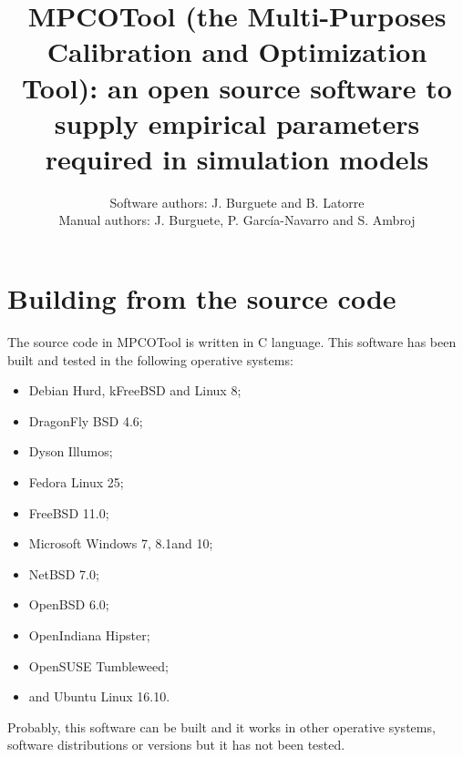 \documentclass[a4paper]{report}
\begin{document}
\title{MPCOTool (the Multi-Purposes Calibration and Optimization Tool): an open
source software to supply empirical parameters required in simulation models}

\author{Software authors: J. Burguete and B. Latorre\\
Manual authors: J. Burguete, P. García-Navarro and S. Ambroj}

\maketitle

\tableofcontents

\chapter{Building from the source code}

The source code in MPCOTool is written in C language. This software has
been built and tested in the following operative systems:
\begin{itemize}
\item Debian Hurd, kFreeBSD and Linux 8;
\item DragonFly BSD 4.6;
\item Dyson Illumos;
\item Fedora Linux 25;
\item FreeBSD 11.0;
\item Microsoft Windows 7\footnotemark[1], 8.1\footnotemark[1] and
	10\footnotemark[1];
\item NetBSD 7.0;
\item OpenBSD 6.0;
\item OpenIndiana Hipster;
\item OpenSUSE Tumbleweed;
\item and Ubuntu Linux 16.10.
\end{itemize}
Probably, this software can be built and it works in other operative systems,
software distributions or versions but it has not been tested.
\end{document}
